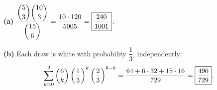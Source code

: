 \textbf{(a)} $\dfrac{\dbinom53\dbinom{10}3}{\dbinom{15}6}=\dfrac{10\cdot120}{5005}=\boxed{\dfrac{240}{1001}}$.

\textbf{(b)} Each draw is white with probability $\dfrac13$, independently:
\[\sum_{k=0}^{2}\dbinom6k\left(\dfrac13\right)^k\left(\dfrac23\right)^{6-k}=\dfrac{64+6\cdot32+15\cdot16}{729}=\boxed{\dfrac{496}{729}}.\]
